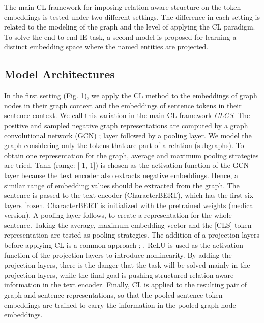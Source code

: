 \documentclass[11pt]{article}
\begin{document}
The main CL framework for imposing relation-aware structure on the token embeddings is tested under two different settings. The difference in each setting is related to the modeling of the graph and the level of applying the CL paradigm. To solve the end-to-end IE task, a second model is proposed for learning a distinct embedding space where the named entities are projected.

\vspace{-1mm}

\subsection{Model Architectures}

In the first setting (Fig. 1), we apply the CL method to the embeddings of graph nodes in their graph context and the embeddings of sentence tokens in their sentence context.  We call this variation in the main CL framework \textit{CLGS}.  The positive and sampled negative graph representations are computed by a graph convolutional network (GCN) \cite{kipf2016semi}; \cite{schlichtkrull2018modeling} layer followed by a pooling layer.  We model the graph considering only the tokens that are part of a relation (subgraphs). To obtain one representation for the graph, average and maximum pooling strategies are tried. Tanh (range: [-1, 1]) is chosen as the activation function of the GCN layer because the text encoder also extracts negative embeddings. Hence, a similar range of embedding values should be extracted from the graph. The sentence is passed to the text encoder (CharacterBERT), which has the first six layers frozen. CharacterBERT is initialized with the pretrained weights (medical version). A pooling layer follows, to create a representation for the whole sentence. Taking the average, maximum embedding vector and the [CLS] token representation are tested as pooling strategies. The addition of a projection layers before applying CL is a common approach \cite{chen2020simple}; \cite{zhang2020contrastive}. ReLU is used as the activation function of the projection layers to introduce nonlinearity. By adding the projection layers, there is the danger that the task will be solved mainly in the projection layers, while the final goal is pushing structured relation-aware information in the text encoder. Finally, CL is applied to the resulting pair of graph and sentence representations, so that the pooled sentence token embeddings are trained to carry the information in the pooled graph node embeddings.
\end{document}
